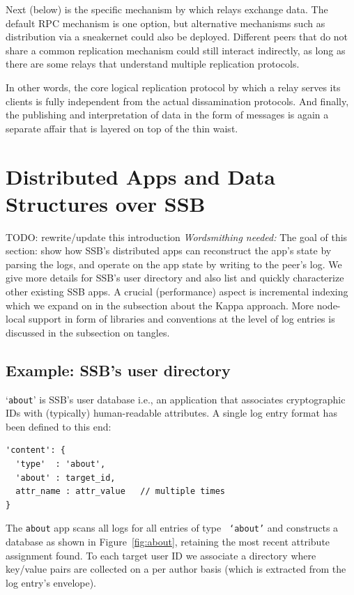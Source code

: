\documentclass[10pt,sigconf]{acmart}
\begin{document}
Next (below) is the specific mechanism by which relays exchange data. The default RPC mechanism is one option, but alternative mechanisms such as distribution via a sneakernet could also be deployed. Different peers that do not share a common replication mechanism could still interact indirectly, as long as there are some relays that understand multiple replication protocols.

In other words, the core logical replication protocol by which a relay serves its clients is fully independent from the actual dissamination protocols. And finally, the publishing and interpretation of data in the form of messages is again a separate affair that is layered on top of the thin waist.

\section{Distributed Apps and Data Structures over SSB}

TODO: rewrite/update this introduction
{\em Wordsmithing needed:}
The goal of this section: show how SSB's distributed apps can reconstruct
the app's state by parsing the logs, and operate on the app state by
writing to the peer's log. We give more details for SSB's user
directory and also list and quickly characterize other existing
SSB apps. A crucial (performance) aspect is incremental indexing
which we expand on in the subsection about the Kappa approach. More
node-local support in form of libraries and conventions at the level
of log entries is discussed in the subsection on tangles.


\subsection{Example: SSB's user directory}
\label{ssect:about}

`{\small\tt about}' is SSB's user database i.e., an application that
associates cryptographic IDs with (typically) human-readable
attributes. A single log entry format has been defined to this end:
{\small\begin{verbatim}
'content': {
  'type'  : 'about',
  'about' : target_id,
  attr_name : attr_value   // multiple times
}
\end{verbatim}}

\noindent
The {\small\tt about} app scans all logs for all entries of type {\small\tt
  `about'} and constructs a database as shown in
Figure~\ref{fig:about}, retaining the most recent attribute assignment
found.  To each target user ID we associate a directory where
key/value pairs are collected on a per author basis (which is extracted
from the log entry's envelope).
\end{document}
